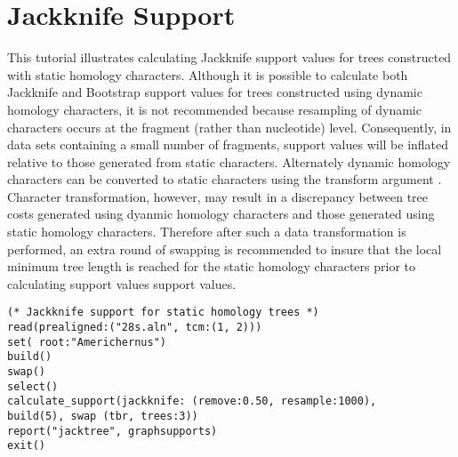 \section{Jackknife Support}{\label{tutorial 4}}

This tutorial illustrates calculating Jackknife support values for trees constructed with static homology characters.  Although it is possible to calculate both Jackknife and Bootstrap support values 
for trees constructed using dynamic homology characters, it is not recommended because resampling of dynamic characters occurs at the fragment (rather than nucleotide) level.  Consequently, in data sets containing a small number of fragments, support values will be inflated relative to those generated from static characters.  Alternately dynamic homology characters can be converted to static characters using the transform argument .  Character transformation, however, may result in a discrepancy between tree costs generated using dyanmic homology characters and those generated using static homology characters.  Therefore after such a data transformation is performed, an extra round of swapping is recommended to insure that the local minimum tree length is reached for the static homology characters prior to calculating support values  support values.

\begin{verbatim}
(* Jackknife support for static homology trees *)
read(prealigned:("28s.aln", tcm:(1, 2)))
set( root:"Americhernus")
build()
swap()
select()
calculate_support(jackknife: (remove:0.50, resample:1000), 
build(5), swap (tbr, trees:3))
report("jacktree", graphsupports)
exit()
\end{verbatim}

